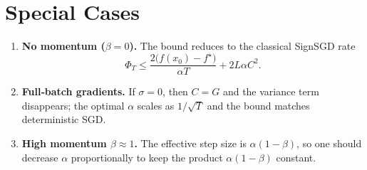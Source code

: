 \documentclass{article}
\begin{document}
\section*{Special Cases}
\begin{enumerate}[label=(\roman*)]
\item \textbf{No momentum ($\beta=0$).}  
The bound reduces to the classical SignSGD rate
\[
\Phi_{T}\le \frac{2\bigl(f(x_{0})-f^{\star}\bigr)}{\alpha T}+2L\alpha C^{2}.
\]
\item \textbf{Full‑batch gradients.}  
If $\sigma=0$, then $C=G$ and the variance term disappears; the optimal $\alpha$ scales as $1/\sqrt{T}$ and the bound matches deterministic SGD.
\item \textbf{High momentum $\beta\approx 1$.}  
The effective step size is $\alpha(1-\beta)$, so one should decrease $\alpha$ proportionally to keep the product $\alpha(1-\beta)$ constant.
\end{enumerate}
\end{document}
